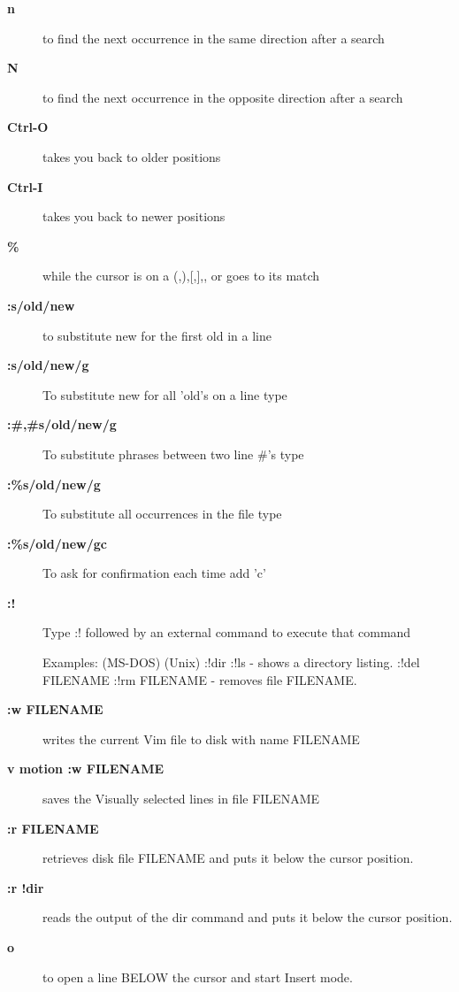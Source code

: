 \documentclass[10pt,a4paper]{scrartcl}
\begin{document}
\begin{description}
\item[\bf{n}] to find the next occurrence in the same direction after a search

\item[\bf{N}] to find the next occurrence in the opposite direction after a search

\item[\bf{Ctrl-O}] takes you back to older positions

\item[\bf{Ctrl-I}] takes you back to newer positions

\item[\bf{\%}] while the cursor is on a (,),[,],{, or } goes to its match

\item[\bf{:s/old/new}] to substitute new for the first old in a line

\item[\bf{:s/old/new/g}] To substitute new for all 'old's on a line type 

\item[\bf{:\#,\#s/old/new/g}] To substitute phrases between two line \#'s type

\item[\bf{:\%s/old/new/g}] To substitute all occurrences in the file type

\item[\bf{:\%s/old/new/gc}] To ask for confirmation each time add 'c'

\item[\bf{:!}] Type  :!  followed by an external command to execute that command

Examples: (MS-DOS)         (Unix)
          :!dir            :!ls            -  shows a directory listing.
          :!del FILENAME   :!rm FILENAME   -  removes file FILENAME.

\item[\bf{:w FILENAME}] writes the current Vim file to disk with name FILENAME

\item[\bf{v  motion  :w FILENAME}]  saves the Visually selected lines in file FILENAME

\item[\bf{:r FILENAME}] retrieves disk file FILENAME and puts it below the
      cursor position.

\item[\bf{:r !dir}] reads the output of the dir command and puts it below the
      cursor position.

\item[\bf{o}] to open a line BELOW the cursor and start Insert mode.


\end{description}
\end{document}

